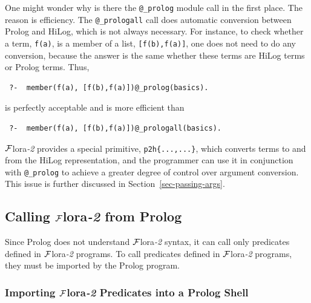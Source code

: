\documentclass[11pt]{article}
\newcommand{\FLORA}{{\mbox{\sc ${\cal F}${lora}\rm\emph{-2}}}\xspace}
\begin{document}
One might wonder why is there the {\tt @\_prolog} module call in the first
place. The reason is efficiency. The {\tt @\_prologall} call does automatic
conversion between Prolog and HiLog, which is not always necessary. For
instance, to check whether a term, {\tt f(a)}, is a member of a list,
{\tt [f(b),f(a)]}, one does not need to do any conversion, because the
answer is the same whether these terms are HiLog terms or Prolog
terms. Thus,
\begin{verbatim}
 ?-  member(f(a), [f(b),f(a)])@_prolog(basics).
\end{verbatim}
is perfectly acceptable and is more efficient than
\begin{verbatim}
 ?-  member(f(a), [f(b),f(a)])@_prologall(basics).
\end{verbatim}
\FLORA provides a special primitive, {\tt p2h\{...,...\}}, which converts terms to
and from the HiLog representation, and the programmer can use it in
conjunction with {\tt @\_prolog} to achieve a greater degree of control
over argument conversion. This issue is further discussed in
Section~\ref{sec-passing-args}.



\subsection{Calling \FLORA from Prolog}\label{sec-flora-from-prolog}

Since Prolog does not understand \FLORA syntax, it can call only
predicates defined in \FLORA programs. To call predicates
defined in \FLORA programs, they must be imported by the Prolog program.

\subsubsection{Importing \FLORA Predicates into a Prolog Shell}
\end{document}
